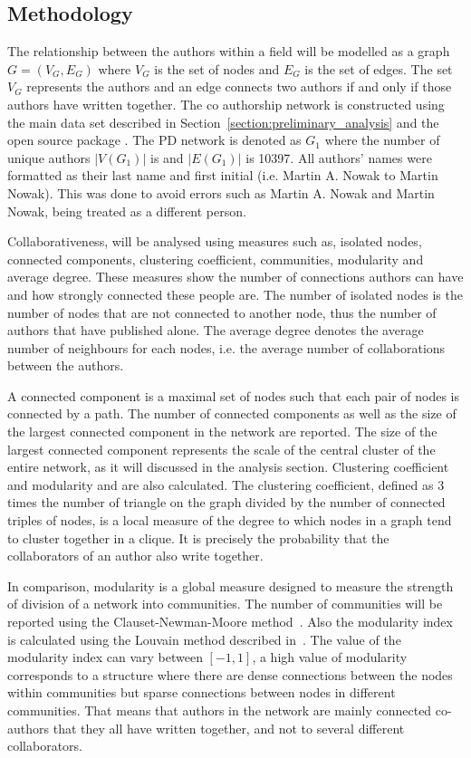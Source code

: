 \documentclass{article}
\theoremstyle{definition}
\newcommand{\authors}{}
\begin{document}
\subsection{Methodology}\label{section:methodology}

The relationship between the authors within a field will be modelled as a graph
\(G = (V_G, E_G)\) where \(V_G\) is the set of nodes and \(E_G\)  is the set of
edges. The set \(V_G\) represents the authors and an edge connects two authors
if and only if those authors have written together. The co authorship network is
constructed using the main data set described in
Section~\ref{section:preliminary_analysis} and the open source package
\cite{networkx}. The PD network is denoted as \(G_1\) where the
number of unique authors \(|V(G_1)|\) is \authors and \(|E(G_1)|\) is 10397.
All authors' names were formatted as their last name and first initial (i.e.
Martin A. Nowak to Martin Nowak). This was done to avoid errors such as Martin
A. Nowak and Martin Nowak, being treated as a different person.

Collaborativeness, will be analysed using measures such as, isolated nodes,
connected components, clustering coefficient, communities, modularity and average degree.
These measures show the number of connections authors can have
and how strongly connected these people are. The number of isolated nodes is the
number of nodes that are not connected to another node, thus the
number of authors that have published alone. The average degree denotes the average
number of neighbours for each nodes, i.e. the average number of collaborations
between the authors.

A connected component is a maximal set of nodes such that each pair of nodes is
connected by a path. The number of connected components as well as the size of the
largest connected component in the network are reported.
The size of the largest connected component represents the scale of the central cluster
of the entire network, as it will discussed in the analysis section.
Clustering coefficient and modularity and are also calculated. The clustering
coefficient, defined as 3 times the number of triangle on the graph divided
by the number of connected triples of nodes, is a local measure of the degree to
which nodes in a graph tend to cluster together
in a clique. It is precisely the probability that the collaborators
of an author also write together.

In comparison, modularity is a global measure designed to measure the strength of
division of a network into communities. The number of communities will be reported
using the Clauset-Newman-Moore method~\cite{clauset2004}. Also the modularity index
is calculated using the Louvain method described in~\cite{Blondel2008}. The value
of the modularity index can vary between \([-1, 1]\), a high value of modularity
corresponds to a structure where there are dense connections between the nodes within
communities but sparse connections between nodes in different communities.
That means that authors in the network are mainly connected co-authors that they
all have written together, and not to several different collaborators.
\end{document}
